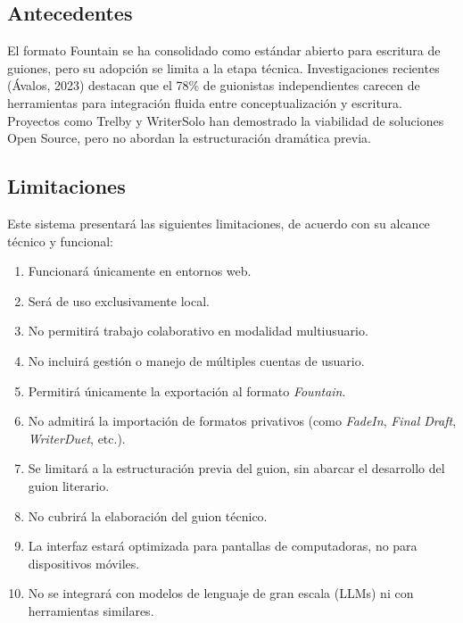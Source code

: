 \documentclass[12pt]{article}
\begin{document}
	\newpage

	\subsection{Antecedentes}

	El formato Fountain se ha consolidado como estándar abierto para escritura de guiones, pero su adopción se limita a la etapa técnica. Investigaciones recientes (Ávalos, 2023) destacan que el 78\% de guionistas independientes carecen de herramientas para integración fluida entre conceptualización y escritura. Proyectos como Trelby y WriterSolo han demostrado la viabilidad de soluciones Open Source, pero no abordan la estructuración dramática previa.

	\newpage

	\subsection{Limitaciones}

	Este sistema presentará las siguientes limitaciones, de acuerdo con su alcance técnico y funcional:

	\begin{enumerate}[label=\arabic*., leftmargin=1.5cm, itemsep=0.8em]
		\item Funcionará únicamente en entornos web.
		\item Será de uso exclusivamente local.
		\item No permitirá trabajo colaborativo en modalidad multiusuario.
		\item No incluirá gestión o manejo de múltiples cuentas de usuario.
		\item Permitirá únicamente la exportación al formato \textit{Fountain}.
		\item No admitirá la importación de formatos privativos (como \textit{FadeIn}, \textit{Final Draft}, \textit{WriterDuet}, etc.).
		\item Se limitará a la estructuración previa del guion, sin abarcar el desarrollo del guion literario.
		\item No cubrirá la elaboración del guion técnico.
		\item La interfaz estará optimizada para pantallas de computadoras, no para dispositivos móviles.
		\item No se integrará con modelos de lenguaje de gran escala (LLMs) ni con herramientas similares.
	\end{enumerate}
\end{document}
